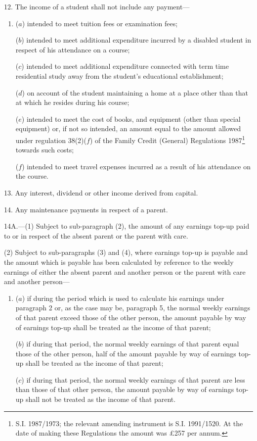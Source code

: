 \documentclass[a4paper]{article}
\begin{document}
\medskip

12.  The income of a student shall not include any payment—
\begin{enumerate}\item[]
($a$) intended to meet tuition fees or examination fees;

($b$) intended to meet additional expenditure incurred by a disabled student in respect of his attendance on a course;

($c$) intended to meet additional expenditure connected with term time residential study away from the student’s educational establishment;

($d$) on account of the student maintaining a home at a place other than that at which he resides during his course;

($e$) intended to meet the cost of books, and equipment (other than special equipment) or, if not so intended, an amount equal to the amount allowed under regulation 38(2)($f$) of the Family Credit (General) Regulations 1987\footnote{\frenchspacing S.I. 1987/1973; the relevant amending instrument is S.I. 1991/1520. At the date of making these Regulations the amount was £257 per annum.} towards such costs;

($f$) intended to meet travel expenses incurred as a result of his attendance on the course.
\end{enumerate}

\medskip

13.  Any interest, dividend or other income derived from capital.

\medskip

14.  Any maintenance payments in respect of a parent.

\medskip

14A.—(1) Subject to sub-paragraph (2), the amount of any earnings top-up paid to or in respect of the absent parent or the parent with care.

(2) Subject to sub-paragraphs (3) and (4), where earnings top-up is payable and the amount which is payable has been calculated by reference to the weekly earnings of either the absent parent and another person or the parent with care and another person—
\begin{enumerate}\item[]
($a$) if during the period which is used to calculate his earnings under paragraph 2 or, as the case may be, paragraph 5, the normal weekly earnings of that parent exceed those of the other person, the amount payable by way of earnings top-up shall be treated as the income of that parent;

($b$) if during that period, the normal weekly earnings of that parent equal those of the other person, half of the amount payable by way of earnings top-up shall be treated as the income of that parent;

($c$) if during that period, the normal weekly earnings of that parent are less than those of that other person, the amount payable by way of earnings top-up shall not be treated as the income of that parent.
\end{enumerate}
\end{document}
